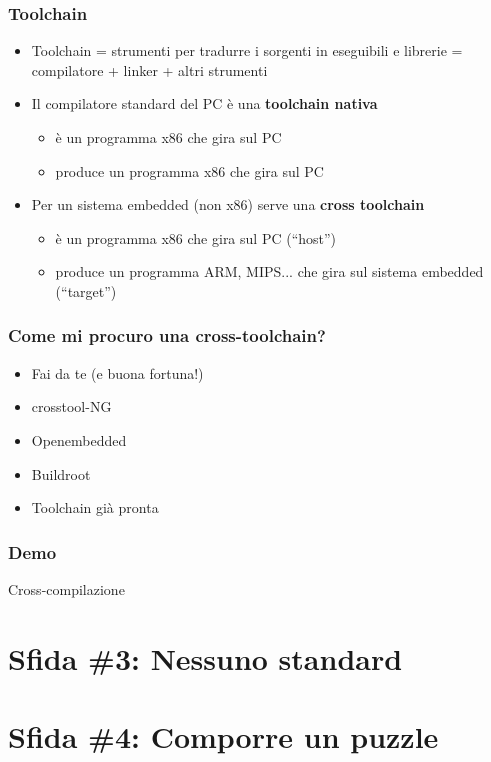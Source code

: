 \documentclass[xetex,table]{beamer}
\begin{document}
\begin{frame}
\frametitle{Toolchain}
  \begin{itemize}
  \item Toolchain = strumenti per tradurre i sorgenti in eseguibili e
    librerie = compilatore + linker + altri strumenti
  \item Il compilatore standard del PC è una {\bf toolchain nativa}
    \begin{itemize}
    \item è un programma x86 che gira sul PC
    \item produce un programma x86 che gira sul PC
    \end{itemize}
  \item Per un sistema embedded (non x86) serve una {\bf cross
    toolchain}
    \begin{itemize}
    \item è un programma x86 che gira sul PC (``host'')
    \item produce un programma ARM, MIPS... che gira sul sistema
      embedded (``target'')
    \end{itemize}
  \end{itemize}
\end{frame}

\begin{frame}
\frametitle{Come mi procuro una cross-toolchain?}
  \begin{itemize}
  \item Fai da te (e buona fortuna!)
  \item crosstool-NG
  \item Openembedded
  \item Buildroot
  \item Toolchain già pronta
  \end{itemize}
\end{frame}

\begin{frame}
\frametitle[Demo! Cross-compilazione]{Demo}
  \begin{center}
    \LARGE
    Cross-compilazione
  \end{center}
\end{frame}

\section{Sfida \#3: Nessuno standard}

\section{Sfida \#4: Comporre un puzzle}
\end{document}
